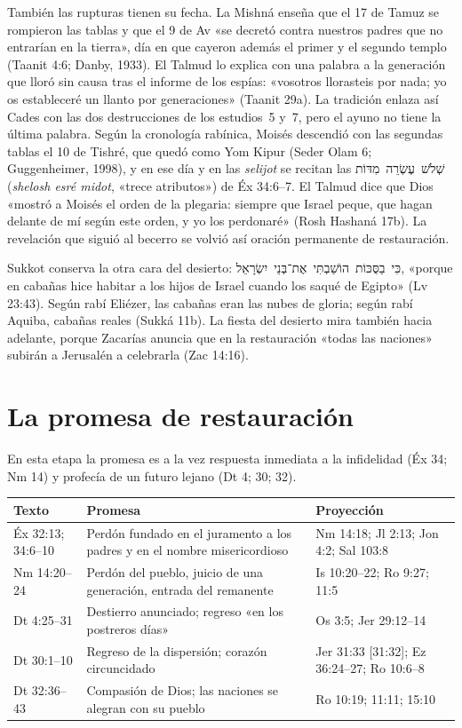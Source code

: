 \documentclass[11pt,letterpaper]{article}
\newcommand{\heb}[1]{\mbox{\foreignlanguage{hebrew}{#1}}}
\begin{document}
También las rupturas tienen su fecha. La Mishná enseña que el 17 de Tamuz se rompieron las tablas y que el 9 de Av «se decretó contra nuestros padres que no entrarían en la tierra», día en que cayeron además el primer y el segundo templo (Taanit 4:6; Danby, 1933). El Talmud lo explica con una palabra a la generación que lloró sin causa tras el informe de los espías: «vosotros llorasteis por nada; yo os estableceré un llanto por generaciones» (Taanit 29a). La tradición enlaza así Cades con las dos destrucciones de los estudios~5 y~7, pero el ayuno no tiene la última palabra. Según la cronología rabínica, Moisés descendió con las segundas tablas el 10 de Tishré, que quedó como Yom Kipur (Seder Olam 6; Guggenheimer, 1998), y en ese día y en las \emph{selijot} se recitan las \heb{שְׁלֹשׁ עֶשְׂרֵה מִדּוֹת} (\emph{shelosh esré midot}, «trece atributos») de Éx 34:6–7. El Talmud dice que Dios «mostró a Moisés el orden de la plegaria: siempre que Israel peque, que hagan delante de mí según este orden, y yo los perdonaré» (Rosh Hashaná 17b). La revelación que siguió al becerro se volvió así oración permanente de restauración.

Sukkot conserva la otra cara del desierto: \heb{כִּי בַסֻּכּוֹת הוֹשַׁבְתִּי אֶת־בְּנֵי יִשְׂרָאֵל}, «porque en cabañas hice habitar a los hijos de Israel cuando los saqué de Egipto» (Lv 23:43). Según rabí Eliézer, las cabañas eran las nubes de gloria; según rabí Aquiba, cabañas reales (Sukká 11b). La fiesta del desierto mira también hacia adelante, porque Zacarías anuncia que en la restauración «todas las naciones» subirán a Jerusalén a celebrarla (Zac 14:16).

\section{La promesa de restauración}\label{sec:resto}

En esta etapa la promesa es a la vez respuesta inmediata a la infidelidad (Éx 34; Nm 14) y profecía de un futuro lejano (Dt 4; 30; 32).

\begin{center}\small
\renewcommand{\arraystretch}{1.2}
\begin{tabular}{>{\RaggedRight\arraybackslash}p{2.5cm}>{\RaggedRight\arraybackslash}p{5.4cm}>{\RaggedRight\arraybackslash}p{6.0cm}}
\toprule
\textbf{Texto} & \textbf{Promesa} & \textbf{Proyección}\\
\midrule
Éx 32:13; 34:6–10 & Perdón fundado en el juramento a los padres y en el nombre misericordioso & Nm 14:18; Jl 2:13; Jon 4:2; Sal 103:8\\
Nm 14:20–24 & Perdón del pueblo, juicio de una generación, entrada del remanente & Is 10:20–22; Ro 9:27; 11:5\\
Dt 4:25–31 & Destierro anunciado; regreso «en los postreros días» & Os 3:5; Jer 29:12–14\\
Dt 30:1–10 & Regreso de la dispersión; corazón circuncidado & Jer 31:33 [31:32]; Ez 36:24–27; Ro 10:6–8\\
Dt 32:36–43 & Compasión de Dios; las naciones se alegran con su pueblo & Ro 10:19; 11:11; 15:10\\
\bottomrule
\end{tabular}\end{center}
\end{document}
